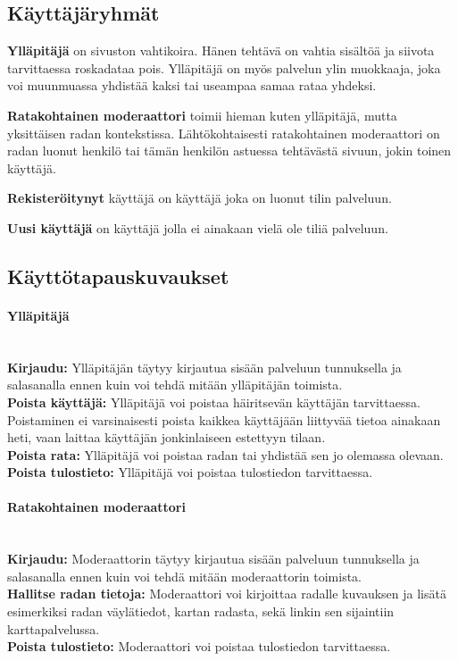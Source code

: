 \documentclass[10pt,a4paper]{article}
\begin{document}
\subsection{Käyttäjäryhmät}
\textbf{Ylläpitäjä} on sivuston vahtikoira. Hänen tehtävä on vahtia sisältöä ja siivota tarvittaessa roskadataa pois. Ylläpitäjä on myös palvelun ylin muokkaaja, joka voi muunmuassa yhdistää kaksi tai useampaa samaa rataa yhdeksi.

\noindent\textbf{Ratakohtainen moderaattori} toimii hieman kuten ylläpitäjä, mutta yksittäisen radan kontekstissa. Lähtökohtaisesti ratakohtainen moderaattori on radan luonut henkilö tai tämän henkilön astuessa tehtävästä sivuun, jokin toinen käyttäjä.

\noindent\textbf{Rekisteröitynyt} käyttäjä on käyttäjä joka on luonut tilin palveluun.

\noindent\textbf{Uusi käyttäjä} on käyttäjä jolla ei ainakaan vielä ole tiliä palveluun.

\subsection{Käyttötapauskuvaukset}
\paragraph{Ylläpitäjä} \hspace{0pt}
\\\textbf{Kirjaudu:} Ylläpitäjän täytyy kirjautua sisään palveluun tunnuksella ja salasanalla ennen kuin voi tehdä mitään ylläpitäjän toimista.
\\\textbf{Poista käyttäjä:} Ylläpitäjä voi poistaa häiritsevän käyttäjän tarvittaessa. Poistaminen ei varsinaisesti poista kaikkea käyttäjään liittyvää tietoa ainakaan heti, vaan laittaa käyttäjän jonkinlaiseen estettyyn tilaan.
\\\textbf{Poista rata:} Ylläpitäjä voi poistaa radan tai yhdistää sen jo olemassa olevaan.
\\\textbf{Poista tulostieto:} Ylläpitäjä voi poistaa tulostiedon tarvittaessa.
\paragraph{Ratakohtainen moderaattori} \hspace{0pt}
\\\textbf{Kirjaudu:} Moderaattorin täytyy kirjautua sisään palveluun tunnuksella ja salasanalla ennen kuin voi tehdä mitään moderaattorin toimista.
\\\textbf{Hallitse radan tietoja:} Moderaattori voi kirjoittaa radalle kuvauksen ja lisätä esimerkiksi radan väylätiedot, kartan radasta, sekä linkin sen sijaintiin karttapalvelussa.
\\\textbf{Poista tulostieto:} Moderaattori voi poistaa tulostiedon tarvittaessa.
\end{document}
